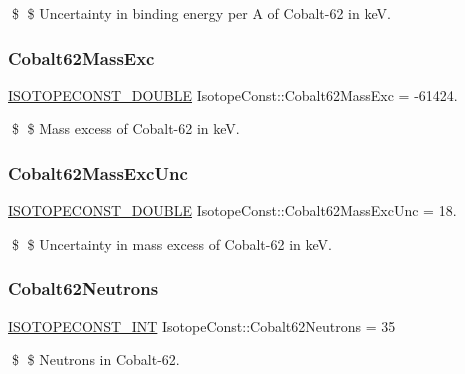 \$ \$ Uncertainty in binding energy per A of Cobalt-\/62 in keV. \mbox{\label{group___isotope_const-_cobalt-_co62_gaac5d9c28d406dfb5299d553ba9214cad}} 
\subsubsection{\texorpdfstring{Cobalt62\+Mass\+Exc}{Cobalt62MassExc}}
{\footnotesize\ttfamily \mbox{\hyperlink{group___isotope_const-_macros_ga8f45a7272ce02c0b4c65c44636ed719a}{I\+S\+O\+T\+O\+P\+E\+C\+O\+N\+S\+T\+\_\+\+D\+O\+U\+B\+LE}} Isotope\+Const\+::\+Cobalt62\+Mass\+Exc = -\/61424.}

\$ \$ Mass excess of Cobalt-\/62 in keV. \mbox{\label{group___isotope_const-_cobalt-_co62_gac7177124260a00a9dcec660c032b962a}} 
\subsubsection{\texorpdfstring{Cobalt62\+Mass\+Exc\+Unc}{Cobalt62MassExcUnc}}
{\footnotesize\ttfamily \mbox{\hyperlink{group___isotope_const-_macros_ga8f45a7272ce02c0b4c65c44636ed719a}{I\+S\+O\+T\+O\+P\+E\+C\+O\+N\+S\+T\+\_\+\+D\+O\+U\+B\+LE}} Isotope\+Const\+::\+Cobalt62\+Mass\+Exc\+Unc = 18.}

\$ \$ Uncertainty in mass excess of Cobalt-\/62 in keV. \mbox{\label{group___isotope_const-_cobalt-_co62_ga18774fa34d601d6bf8848aca720d43ab}} 
\subsubsection{\texorpdfstring{Cobalt62\+Neutrons}{Cobalt62Neutrons}}
{\footnotesize\ttfamily \mbox{\hyperlink{group___isotope_const-_macros_ga5f18360b3e99483a35c32d789e62621c}{I\+S\+O\+T\+O\+P\+E\+C\+O\+N\+S\+T\+\_\+\+I\+NT}} Isotope\+Const\+::\+Cobalt62\+Neutrons = 35}

\$ \$ Neutrons in Cobalt-\/62. \mbox{\label{group___isotope_const-_cobalt-_co62_gac7ca52beb8e4e034f6f9c684f6df501b}} 

